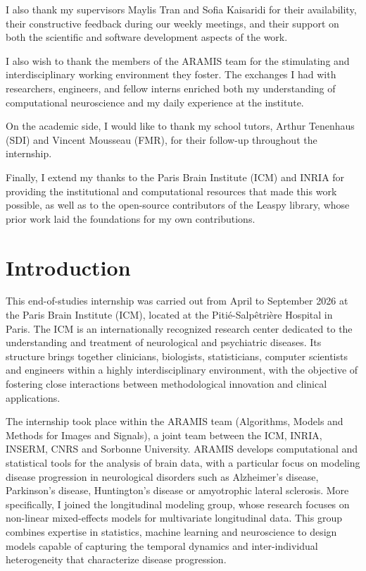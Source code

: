 \documentclass{rapportCS}
\begin{document}
I also thank my supervisors Maylis Tran and Sofia Kaisaridi for their availability, their constructive feedback during our weekly meetings, and their support on both the scientific and software development aspects of the work.

I also wish to thank the members of the {ARAMIS team} for the stimulating and interdisciplinary working environment they foster. The exchanges I had with researchers, engineers, and fellow interns enriched both my understanding of computational neuroscience and my daily experience at the institute.

On the academic side, I would like to thank my school tutors, {Arthur Tenenhaus} (SDI) and {Vincent Mousseau} (FMR), for their follow-up throughout the internship.

Finally, I extend my thanks to the {Paris Brain Institute (ICM)} and {INRIA} for providing the institutional and computational resources that made this work possible, as well as to the open-source contributors of the {Leaspy} library, whose prior work laid the foundations for my own contributions.
\newpage


\tableofcontents
\newpage   


\section{Introduction} 

This end-of-studies internship was carried out from April to September 2026 at the Paris Brain Institute (ICM), located at the Pitié-Salpêtrière Hospital in Paris. The ICM is an internationally recognized research center dedicated to the understanding and treatment of neurological and psychiatric diseases. Its structure brings together clinicians, biologists, statisticians, computer scientists and engineers within a highly interdisciplinary environment, with the objective of fostering close interactions between methodological innovation and clinical applications.

The internship took place within the ARAMIS team (Algorithms, Models and Methods for Images and Signals), a joint team between the ICM, INRIA, INSERM, CNRS and Sorbonne University. ARAMIS develops computational and statistical tools for the analysis of brain data, with a particular focus on modeling disease progression in neurological disorders such as Alzheimer's disease, Parkinson's disease, Huntington's disease or amyotrophic lateral sclerosis. More specifically, I joined the longitudinal modeling group, whose research focuses on non-linear mixed-effects models for multivariate longitudinal data. This group combines expertise in statistics, machine learning and neuroscience to design models capable of capturing the temporal dynamics and inter-individual heterogeneity that characterize disease progression.
\end{document}
